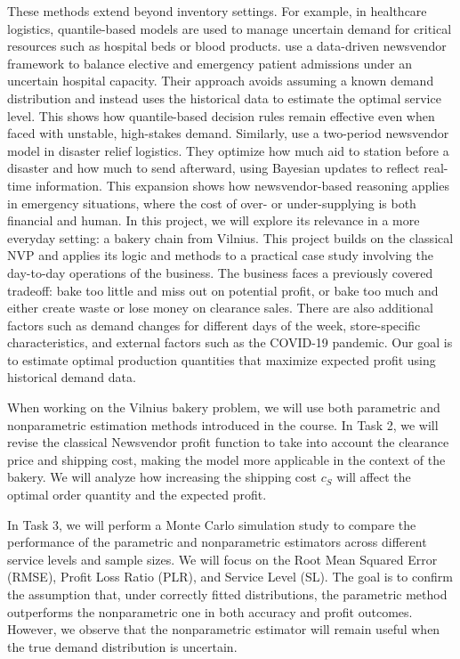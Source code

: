 These methods extend beyond inventory settings. For example, in healthcare logistics, quantile-based models are used to manage uncertain demand for critical resources such as hospital beds or blood products. \cite{shen2024} use a data-driven newsvendor framework to balance elective and emergency patient admissions under an uncertain hospital capacity. Their approach avoids assuming a known demand distribution and instead uses the historical data to estimate the optimal service level. This shows how quantile-based decision rules remain effective even when faced with unstable, high-stakes demand.
Similarly, \cite{patra2021} use a two-period newsvendor model in disaster relief logistics. They optimize how much aid to station before a disaster and how much to send afterward, using Bayesian updates to reflect real-time information. This expansion shows how newsvendor-based reasoning applies in emergency situations, where the cost of over- or under-supplying is both financial and human.
In this project, we will explore its relevance in a more everyday setting: a bakery chain from Vilnius. This project builds on the classical NVP and applies its logic and methods to a practical case study involving the day-to-day operations of the business. The business faces a previously covered tradeoff: bake too little and miss out on potential profit, or bake too much and either create waste or lose money on clearance sales. There are also additional factors such as demand changes for different days of the week, store-specific characteristics, and external factors such as the COVID-19 pandemic. Our goal is to estimate optimal production quantities that maximize expected profit using historical demand data.

When working on the Vilnius bakery problem, we will use both parametric and nonparametric estimation methods introduced in the course. In Task 2, we will revise the classical Newsvendor profit function to take into account the clearance price and shipping cost, making the model more applicable in the context of the bakery. We will analyze how increasing the shipping cost \( c_S \) will affect the optimal order quantity and the expected profit.

In Task 3, we will perform a Monte Carlo simulation study to compare the performance of the parametric and nonparametric estimators across different service levels and sample sizes. We will focus on the Root Mean Squared Error (RMSE), Profit Loss Ratio (PLR), and Service Level (SL). The goal is to confirm the assumption that, under correctly fitted distributions, the parametric method outperforms the nonparametric one in both accuracy and profit outcomes. However, we observe that the nonparametric estimator will remain useful when the true demand distribution is uncertain.

